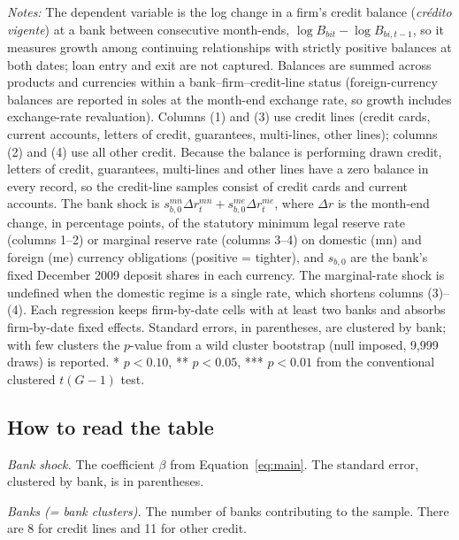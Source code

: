 \documentclass[11pt]{article}
\renewcommand{\_}{\origunderscore\hspace{0pt}}  %
\begin{document}
\begin{table}[!h]
\begin{threeparttable}[b]
      \begin{tablenotes}\item \textit{Notes:} The dependent variable is the log change in a firm's credit balance (\textit{cr\'edito vigente}) at a bank between consecutive month-ends, $\log B_{bit}-\log B_{bi,t-1}$, so it measures growth among continuing relationships with strictly positive balances at both dates; loan entry and exit are not captured. Balances are summed across products and currencies within a bank--firm--credit-line status (foreign-currency balances are reported in soles at the month-end exchange rate, so growth includes exchange-rate revaluation). Columns (1) and (3) use credit lines (credit cards, current accounts, letters of credit, guarantees, multi-lines, other lines); columns (2) and (4) use all other credit. Because the balance is performing drawn credit, letters of credit, guarantees, multi-lines and other lines have a zero balance in every record, so the credit-line samples consist of credit cards and current accounts. The bank shock is $s^{mn}_{b,0}\Delta r^{mn}_{t}+s^{me}_{b,0}\Delta r^{me}_{t}$, where $\Delta r$ is the month-end change, in percentage points, of the statutory minimum legal reserve rate (columns 1--2) or marginal reserve rate (columns 3--4) on domestic (mn) and foreign (me) currency obligations (positive = tighter), and $s_{b,0}$ are the bank's fixed December 2009 deposit shares in each currency. The marginal-rate shock is undefined when the domestic regime is a single rate, which shortens columns (3)--(4). Each regression keeps firm-by-date cells with at least two banks and absorbs firm-by-date fixed effects. Standard errors, in parentheses, are clustered by bank; with few clusters the $p$-value from a wild cluster bootstrap (null imposed, 9,999 draws) is reported. * $p<0.10$, ** $p<0.05$, *** $p<0.01$ from the conventional clustered $t(G-1)$ test.
      \end{tablenotes}
   \end{threeparttable}
\end{table}

\subsection{How to read the table}

\textit{Bank shock.}
The coefficient $\beta$ from Equation~\eqref{eq:main}.
The standard error, clustered by bank, is in parentheses.

\textit{Banks (= bank clusters).}
The number of banks contributing to the sample.
There are 8 for credit lines and 11 for other credit.
\end{document}
